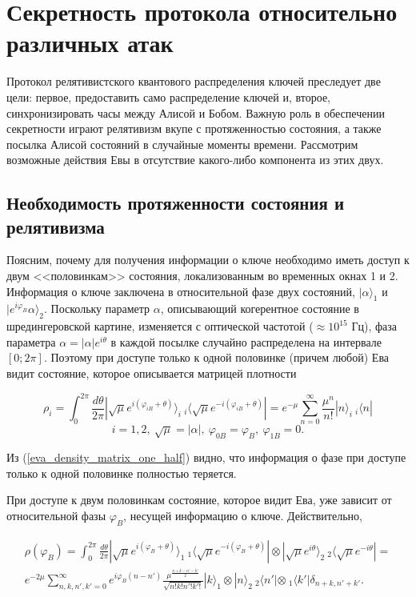 \section{Секретность протокола относительно различных атак}
Протокол релятивистского квантового распределения ключей преследует две цели: первое, предоставить само распределение ключей и, второе, синхронизировать часы между Алисой и Бобом.
Важную роль в обеспечении секретности играют релятивизм вкупе с протяженностью состояния, а также посылка Алисой состояний в случайные моменты времени.
Рассмотрим возможные действия Евы в отсутствие какого-либо компонента из этих двух.

\subsection{Необходимость протяженности состояния и релятивизма}
Поясним, почему для получения информации о ключе необходимо иметь доступ к двум <<половинкам>> состояния, локализованным во временных окнах 1 и 2. 
Информация о ключе заключена в относительной фазе двух состояний, $|\alpha\rangle_1$ и $|e^{i\varphi_B}\alpha\rangle_2$.
Поскольку параметр $\alpha$, описывающий когерентное состояние в шредингеровской картине, изменяется с оптической частотой ($\approx 10^{15}$ Гц), фаза параметра $\alpha = |\alpha|e^{i\theta}$
в каждой посылке случайно распределена на интервале $[0; 2\pi]$. Поэтому при доступе только к одной половинке (причем любой) Ева видит состояние, которое описывается матрицей плотности

\begin{equation}\label{eva_density_matrix_one_half}
    \rho_i = \int^{2\pi}_0 
{\frac{d\theta}{2\pi} 
|\sqrt{\mu} e^{i(\varphi_{iB} + \theta)} \rangle_i ~ 
{}_i \langle \sqrt{\mu}e^{-i(\varphi_{iB} + \theta)} | } = 
e^{-\mu} \sum^\infty_{n=0} {\frac{\mu^n}{n!} |n\rangle_i ~{}_i \langle n | }
\end{equation}
\begin{equation*}
  i = 1,2,~\sqrt{\mu}=|\alpha|,~\varphi_{0B} = \varphi_B,~\varphi_{1B} = 0.
\end{equation*}

Из (\ref{eva_density_matrix_one_half}) видно, что информация о фазе при доступе только к одной половинке полностью теряется.

При доступе к двум половинкам состояние, которое видит Ева, уже зависит от относительной фазы $\varphi_B$, несущей информацию о ключе. Действительно,

\begin{eqnarray}\label{eva_density_matrix_full}
    \rho(\varphi_B) = \int^{2\pi}_0 
{
\frac{d\theta}{2\pi} 
|\sqrt{\mu} e^{i(\varphi_{B} + \theta)} \rangle_1 ~ 
{}_1 \langle \sqrt{\mu}e^{-i(\varphi_{B} + \theta)} |
\otimes
|\sqrt{\mu} e^{i\theta} \rangle_2 ~ 
{}_2 \langle \sqrt{\mu}e^{-i\theta} |
} =  \nonumber\\
e^{-2\mu} \sum^\infty_{n,k,n',k'=0} 
{
  e^{i\varphi_B(n-n')}
  \frac
    {\mu^{\frac{n+k-n'-k'}{2}}}
    {\sqrt{n!k!n'!k'!}} 
  |k\rangle_1 
  \otimes
  |n\rangle_2 ~{}_2 \langle n' | 
  \otimes
  ~{}_1 \langle k' | \delta_{n+k,n'+k'}.
}
\end{eqnarray}


